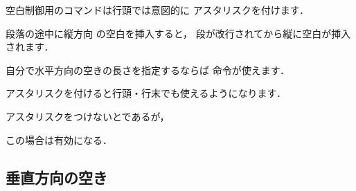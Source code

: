 \begin{inout}
 \hspace{1cm} 空白制御用のコマンドは行頭では意図的に
 \vspace{1cm} アスタリスクを付けます．\par\hspace{1cm}
 段落の途中に縦方向 \hspace{1cm} の空白を挿入すると，
 段が改行されてから縦に空白が挿入されます．
\end{inout}

自分で水平方向の空きの長さを指定するならば 
命令が使えます．
\begin{usage}
\hspace*{$\<長さ>$} 
\end{usage}
アスタリスクを付けると行頭・行末でも使えるようになります．
\begin{inout}
アスタリスクをつけないと\hspace{2zw}であるが，\par
\hspace*{-2zw}この場合は有効になる．
\end{inout}


\subsection{垂直方向の空き}

